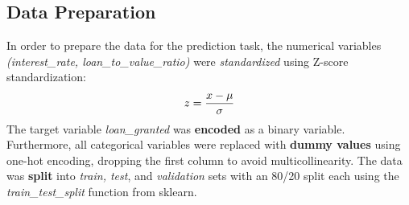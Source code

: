\subsection{Data Preparation}\label{subsec:Date_Preparation}

In order to prepare the data for the prediction task, the numerical variables \textit{(interest\_rate, loan\_to\_value\_ratio)} were \textit{standardized} using Z-score standardization: 
\begin{equation}
    z = \frac{x - \mu}{\sigma}
    \label{eq:Z-Score Standardization}
    \addcontentsline{frm}{formulas}{\protect\numberline{\theequation}\hspace{1em}Z-Score Standardization}
\end{equation}
The target variable \textit{loan\_granted} was \textbf{encoded} as a binary variable. Furthermore, all categorical variables were replaced with \textbf{dummy values} using one-hot encoding, dropping the first column to avoid multicollinearity.
The data was \textbf{split} into \textit{train, test}, and \textit{validation} sets with an 80/20 split each using the \textit{train\_test\_split} function from sklearn.